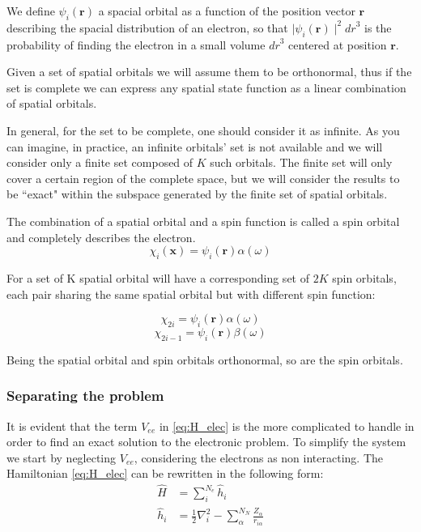 \documentclass[a4paper,12pt]{article}
\begin{document}
We define $\psi_i(\mathbf{r})$ a spacial orbital as a function of the position vector $\mathbf{r}$ describing the spacial distribution of an electron, so that $\mid\psi_i(\mathbf{r})\mid^2 {dr}^3$ is the probability of finding the electron in a small volume ${dr}^3$ centered at position $\mathbf{r}$.

Given a set of spatial orbitals we will assume them to be orthonormal, thus if the set is complete we can express any spatial state function as a linear combination of spatial orbitals.

In general, for the set to be complete, one should consider it as infinite. As you can imagine, in practice, an infinite orbitals' set is not available and we will consider only a finite set composed of $K$ such orbitals. The finite set will only cover a certain region of the complete space, but we will consider the results to be ``exact" within the subspace generated by the finite set of spatial orbitals.

The combination of a spatial orbital and a spin function is called a spin orbital and completely describes the electron. 
\begin{equation}
	\chi_{i}(\mathbf{x}) = \psi_i(\mathbf{r}) \alpha(\omega)
\end{equation}


For a set of K spatial orbital will have a corresponding set of $2K$ spin orbitals, each pair sharing the same spatial orbital but with different spin function:

\begin{equation}
	\chi_{2i} = \psi_i(\mathbf{r}) \alpha(\omega)
\end{equation}
\begin{equation}
	\chi_{2i-1} = \psi_i(\mathbf{r}) \beta(\omega)
\end{equation}

Being the spatial orbital and spin orbitals orthonormal, so are the spin orbitals.

\subsubsection{Separating the problem}

It is evident that the term $V_{ee}$ in \eqref{eq:H_elec} is the more complicated to handle in order to find an exact solution to the electronic problem.
To simplify the system we start by neglecting $V_{ee}$, considering the electrons as non interacting.
The Hamiltonian \eqref{eq:H_elec} can be rewritten in the following form:
\begin{align}
	\hat{H} & = \sum_{i}^{N_{e}} \hat{h}_{i} \label{eq:HartreeHamiltonian} 
	\\
	\hat{h}_{i} & = \frac{1}{2} \nabla_{i}^2 - \sum_{\alpha}^{N_{N}} \frac{Z_{\alpha}}{r_{i\alpha}} \label{eq:singleEl}
\end{align}
\end{document}
